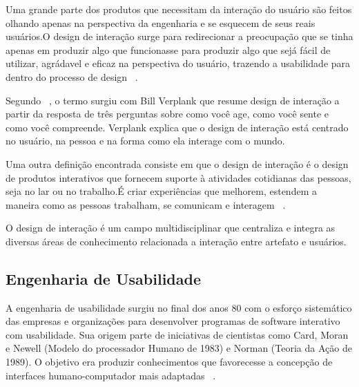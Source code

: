 	Uma grande parte dos produtos que necessitam da interação do usuário são feitos olhando apenas na perspectiva da engenharia e se esquecem de seus reais usuários.O design de interação surge para redirecionar a preocupação que se tinha apenas em produzir algo que funcionasse para produzir algo que sejá fácil de utilizar, agrádavel e eficaz na perspectiva do usuário, trazendo a usabilidade para dentro do processo de design ~\cite{preece2007}.

	Segundo ~\cite{moggridge2006}, o termo surgiu com Bill Verplank que resume design de interação a partir da resposta de três perguntas sobre como você age, como você sente e como você compreende. Verplank explica que o design de interação está centrado no usuário, na pessoa e na forma como ela interage com o mundo.
	
	Uma outra definição encontrada consiste em que o design de interação é o design de produtos interativos que fornecem suporte à atividades cotidianas das pessoas, seja no lar ou no trabalho.É criar experiências que melhorem, estendem a maneira como as pessoas trabalham, se comunicam e interagem ~\cite{preece2007}.

	O design de interação é um campo multidisciplinar que centraliza e integra as diversas áreas de conhecimento relacionada a interação entre artefato e usuários.


	





\subsection{Engenharia de Usabilidade}

A engenharia de usabilidade surgiu no final dos anos 80 com o esforço sistemático das empresas e organizações para desenvolver programas de software interativo com usabilidade. Sua origem parte de iniciativas de cientistas como Card, Moran e Newell (Modelo do processador Humano de 1983) e Norman (Teoria da Ação de 1989). O objetivo era produzir conhecimentos que favorecesse a concepção de interfaces humano-computador mais adaptadas ~\cite{cybis2010}.

